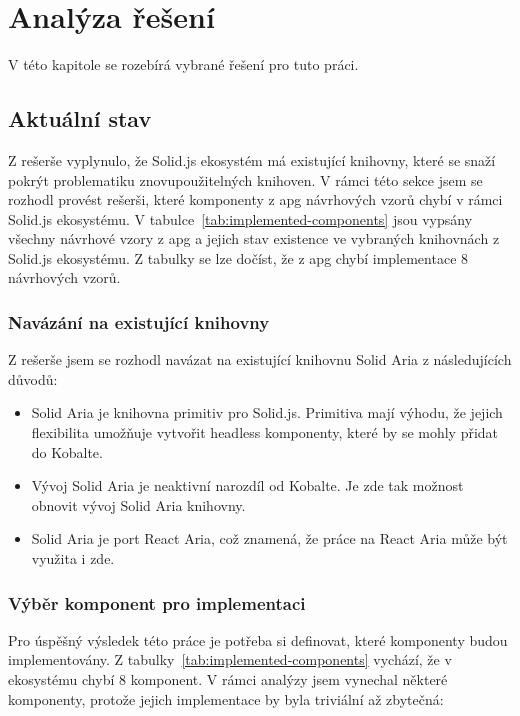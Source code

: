 \chapter{Analýza řešení}
\label{chap:analysis}

V této kapitole se rozebírá vybrané řešení pro tuto práci.

\section{Aktuální stav}

Z rešerše vyplynulo, že Solid.js ekosystém má existující knihovny, které se snaží pokrýt problematiku znovupoužitelných knihoven.
V rámci této sekce jsem se rozhodl provést rešerši, které komponenty z \gls{apg} návrhových vzorů chybí v rámci Solid.js ekosystému.
V tabulce~\ref{tab:implemented-components} jsou vypsány všechny návrhové vzory z \gls{apg} a jejich stav existence ve vybraných knihovnách z Solid.js ekosystému.
Z tabulky se lze dočíst, že z \gls{apg} chybí implementace 8 návrhových vzorů.

\subsection{Navázání na existující knihovny}

Z rešerše jsem se rozhodl navázat na existující knihovnu Solid Aria z následujících důvodů:

\begin{itemize}
    \item Solid Aria je knihovna primitiv pro Solid.js. Primitiva mají výhodu, že jejich flexibilita umožňuje vytvořit headless komponenty, které by se mohly přidat do Kobalte.
    \item Vývoj Solid Aria je neaktivní narozdíl od Kobalte. Je zde tak možnost obnovit vývoj Solid Aria knihovny.
    \item Solid Aria je port React Aria, což znamená, že práce na React Aria může být využita i zde.
\end{itemize}

\subsection{Výběr komponent pro implementaci}

Pro úspěšný výsledek této práce je potřeba si definovat, které komponenty budou implementovány.
Z tabulky~\ref{tab:implemented-components} vychází, že v ekosystému chybí 8 komponent.
V rámci analýzy jsem vynechal některé komponenty, protože jejich implementace by byla triviální až zbytečná:

